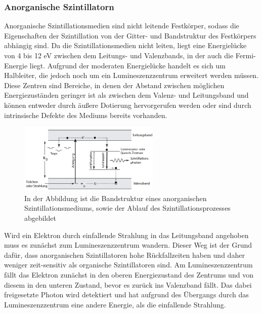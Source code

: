             \subsubsection*{Anorganische Szintillatorn}
                Anorganische Szintillationsmedien sind nicht leitende Festkörper, sodass die Eigenschaften der Szintillation von der Gitter- und Bandstruktur des Festkörpers abhängig sind. Da die 
                Szintillationsmedien nicht leiten, liegt eine Energielücke von 4 bis 12 eV zwischen dem Leitungs- und Valenzbands, in der auch die Fermi-Energie liegt. Aufgrund der moderaten Energielücke 
                handelt es sich um Halbleiter, die jedoch noch um ein Lumineszenzzentrum erweitert werden müssen. Diese Zentren sind Bereiche, in denen der Abstand zwischen möglichen Energiezuständen geringer 
                ist als zwischen dem Valenz- und Leitungsband und können entweder durch äußere Dotierung hervorgerufen werden oder sind durch intrinsische Defekte des Mediums bereits vorhanden.
                
                \FloatBarrier

                \begin{figure}[h]
                  \centering
                  \includegraphics[width = 0.6\textwidth]{pictures/Bandstruktur.png}
                  \caption{In der Abbildung ist die Bandstruktur eines anorganischen Szintillationsmediums, sowie der Ablauf des Szintillationsprozesses abgebildet}
                  \label{fig:Bandstruktur}
                \end{figure}
        
                \FloatBarrier
        
                \noindent

                Wird ein Elektron durch einfallende Strahlung in das Leitungsband angehoben muss es zunächst zum Lumineszenzzentrum wandern. Dieser Weg ist der Grund dafür, dass anorganischen Szintillatoren
                hohe Rückfallzeiten haben und daher weniger zeit-sensitiv als organische Szintillatoren sind. Am Lumineszenzzentrum fällt das Elektron zunächst in den oberen Energiezustand des Zentrums und
                von diesem in den unteren Zustand, bevor es zurück ins Valenzband fällt. Das dabei freigesetzte Photon wird detektiert und hat aufgrund des Übergangs durch das Lumineszenzzentrum eine andere 
                Energie, als die einfallende Strahlung.


